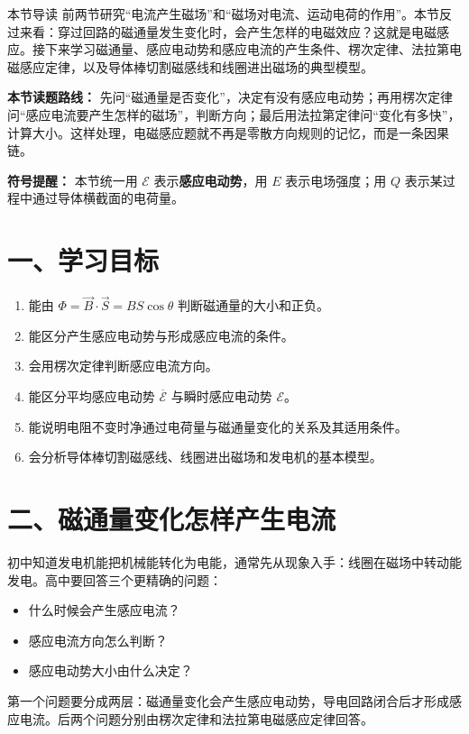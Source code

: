 
\begin{learningbox}{本节导读}
前两节研究“电流产生磁场”和“磁场对电流、运动电荷的作用”。本节反过来看：穿过回路的磁通量发生变化时，会产生怎样的电磁效应？这就是电磁感应。接下来学习磁通量、感应电动势和感应电流的产生条件、楞次定律、法拉第电磁感应定律，以及导体棒切割磁感线和线圈进出磁场的典型模型。
\end{learningbox}

\textbf{本节读题路线：} 先问“磁通量是否变化”，决定有没有感应电动势；再用楞次定律问“感应电流要产生怎样的磁场”，判断方向；最后用法拉第定律问“变化有多快”，计算大小。这样处理，电磁感应题就不再是零散方向规则的记忆，而是一条因果链。

\textbf{符号提醒：} 本节统一用 $\mathcal E$ 表示\textbf{感应电动势}，用 $E$ 表示电场强度；用 $Q$ 表示某过程中通过导体横截面的电荷量。

\section*{一、学习目标}
\begin{enumerate}
  \item 能由 $\Phi=\vec B\cdot\vec S=BS\cos\theta$ 判断磁通量的大小和正负。
  \item 能区分产生感应电动势与形成感应电流的条件。
  \item 会用楞次定律判断感应电流方向。
  \item 能区分平均感应电动势 $\overline{\mathcal E}$ 与瞬时感应电动势 $\mathcal E$。
  \item 能说明电阻不变时净通过电荷量与磁通量变化的关系及其适用条件。
  \item 会分析导体棒切割磁感线、线圈进出磁场和发电机的基本模型。
\end{enumerate}
\section*{二、磁通量变化怎样产生电流}

初中知道发电机能把机械能转化为电能，通常先从现象入手：线圈在磁场中转动能发电。高中要回答三个更精确的问题：
\begin{itemize}
  \item 什么时候会产生感应电流？
  \item 感应电流方向怎么判断？
  \item 感应电动势大小由什么决定？
\end{itemize}

第一个问题要分成两层：磁通量变化会产生感应电动势，导电回路闭合后才形成感应电流。后两个问题分别由楞次定律和法拉第电磁感应定律回答。

